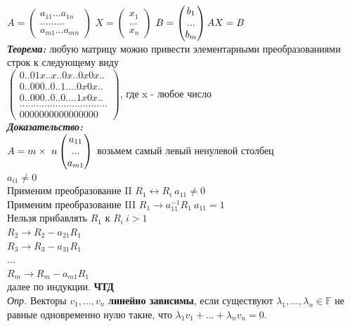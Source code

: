\documentclass[12pt, oneside]{book}
\theoremstyle{definition}
\begin{document}
\begin{enumerate}
$A = 
\begin{pmatrix}
    a_{11} ... a_{1n} \\
    ... ... ... \\
    a_{m1} ... a_{mn}
\end{pmatrix}$
$X = 
\begin{pmatrix}
    x_1 \\
    ... \\
    x_n
\end{pmatrix}$
$B = 
\begin{pmatrix}
    b_1 \\
    ... \\
    b_m
\end{pmatrix} \\
AX = B$ \\
\textit{\textbf{Теорема:}} любую матрицу можно привести элементарными преобразованиями строк к следующему виду \\
$\begin{pmatrix}
    0 .. 0 1 x .. x .. 0 x .. 0 x 0 x .. \\
    0 .. 0 0 0 .. 0 .. 1 .. .. 0 x 0 x .. \\
    0 .. 0 0 0 .. 0 .. 0 .. .. 1 x 0 x .. \\
    .. .. .. .. .. .. .. .. .. .. .. .. .. .. .. .. \\
    0 0 0 0 0 0 0 0 0 0 0 0 0 0 0 0 
\end{pmatrix}$, где x - любое число \\
\textit{\textbf{Доказательство:}}\\
$A = m \times \ n \\
\begin{pmatrix}
    a_{11} \\
    ... \\
    a_{m1}
\end{pmatrix}$
возьмем самый левый ненулевой столбец \\
$a_{i1} \neq 0$ \\
Применим преобразование II $R_1 \leftrightarrow R_i \ a_{11} \neq 0$\\
Применим преобразование III $R_1 \rightarrow a^{-1}_{11} R_1 \ a_{11} = 1$\\
Нельзя прибавлять $R_1$ к $R_i \ i > 1$\\
$R_2 \rightarrow R_2 - a_{21} R_1$ \\
$R_3 \rightarrow R_3 - a_{31} R_1$\\
... \\
$R_m \rightarrow R_m - a_{m1} R_1$\\
далее по индукции. \textbf{ЧТД} \\
\textit{Опр.} Векторы $v_1, ... , v_n$ \textbf{линейно зависимы}, если существуют $\lambda_1, ... , \lambda_n \in \mathbb{F}$ не равные одновременно нулю такие, что $\lambda_1 v_1 + ... + \lambda_n v_n = 0.$\\



\end{enumerate}
\end{document}
